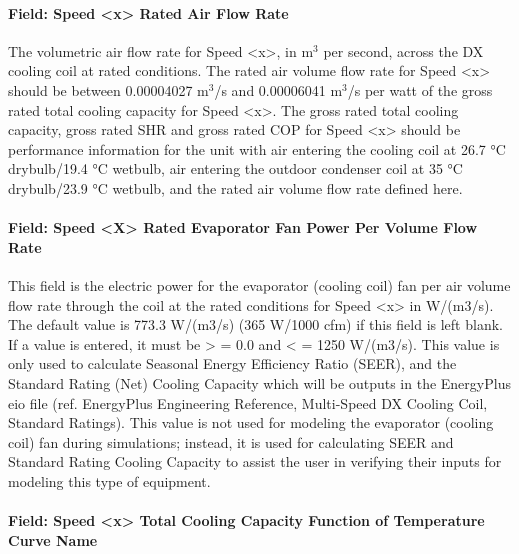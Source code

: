\paragraph{Field: Speed \textless{}x\textgreater{} Rated Air Flow Rate}\label{field-speed-x-rated-air-flow-rate}

The volumetric air flow rate for Speed \textless{}x\textgreater{}, in m\(^{3}\) per second, across the DX cooling coil at rated conditions. The rated air volume flow rate for Speed \textless{}x\textgreater{} should be between 0.00004027 m\(^{3}\)/s and 0.00006041 m\(^{3}\)/s per watt of the gross rated total cooling capacity for Speed \textless{}x\textgreater{}. The gross rated total cooling capacity, gross rated SHR and gross rated COP for Speed \textless{}x\textgreater{} should be performance information for the unit with air entering the cooling coil at 26.7 °C drybulb/19.4 °C wetbulb, air entering the outdoor condenser coil at 35 °C drybulb/23.9 °C wetbulb, and the rated air volume flow rate defined here.

\paragraph{Field: Speed \textless{}X\textgreater{} Rated Evaporator Fan Power Per Volume Flow Rate}\label{field-speed-x-rated-evaporator-fan-power-per-volume-flow-rate}

This field is the electric power for the evaporator (cooling coil) fan per air volume flow rate through the coil at the rated conditions for Speed \textless{}x\textgreater{} in W/(m3/s). The default value is 773.3 W/(m3/s) (365 W/1000 cfm) if this field is left blank. If a value is entered, it must be \textgreater{} = 0.0 and \textless{} = 1250 W/(m3/s). This value is only used to calculate Seasonal Energy Efficiency Ratio (SEER), and the Standard Rating (Net) Cooling Capacity which will be outputs in the EnergyPlus eio file (ref. EnergyPlus Engineering Reference, Multi-Speed DX Cooling Coil, Standard Ratings). This value is not used for modeling the evaporator (cooling coil) fan during simulations; instead, it is used for calculating SEER and Standard Rating Cooling Capacity to assist the user in verifying their inputs for modeling this type of equipment.

\paragraph{Field: Speed \textless{}x\textgreater{} Total Cooling Capacity Function of Temperature Curve Name}\label{field-speed-x-total-cooling-capacity-function-of-temperature-curve-name}


